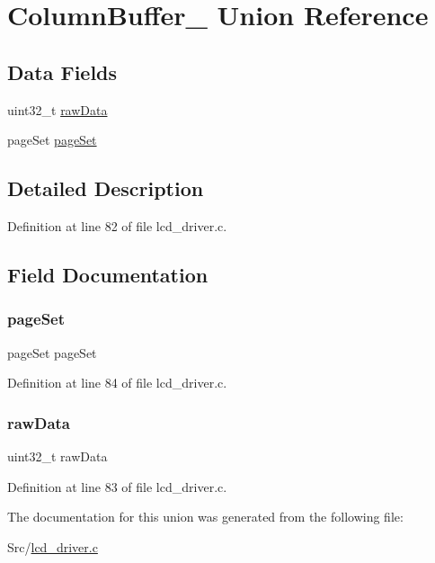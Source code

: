 \hypertarget{union_column_buffer__}{}\section{Column\+Buffer\+\_\+ Union Reference}
\label{union_column_buffer__}
\subsection*{Data Fields}
\begin{DoxyCompactItemize}
\item 
uint32\+\_\+t \mbox{\hyperlink{union_column_buffer___a582fa2ca99b13c0df79f2fd2445ac31e}{raw\+Data}}
\item 
page\+Set \mbox{\hyperlink{union_column_buffer___a7e95b3d635528dfbaee7b3ea7b305277}{page\+Set}}
\end{DoxyCompactItemize}


\subsection{Detailed Description}


Definition at line 82 of file lcd\+\_\+driver.\+c.



\subsection{Field Documentation}
\mbox{\label{union_column_buffer___a7e95b3d635528dfbaee7b3ea7b305277}} 
\subsubsection{\texorpdfstring{page\+Set}{pageSet}}
{\footnotesize\ttfamily page\+Set page\+Set}



Definition at line 84 of file lcd\+\_\+driver.\+c.

\mbox{\label{union_column_buffer___a582fa2ca99b13c0df79f2fd2445ac31e}} 
\subsubsection{\texorpdfstring{raw\+Data}{rawData}}
{\footnotesize\ttfamily uint32\+\_\+t raw\+Data}



Definition at line 83 of file lcd\+\_\+driver.\+c.



The documentation for this union was generated from the following file\+:\begin{DoxyCompactItemize}
\item 
Src/\mbox{\hyperlink{lcd__driver_8c}{lcd\+\_\+driver.\+c}}\end{DoxyCompactItemize}
